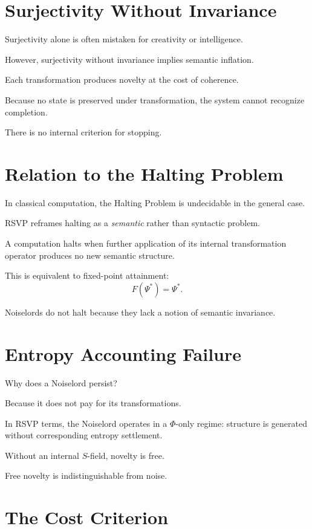 \documentclass[11pt]{book}
\begin{document}
\section{Surjectivity Without Invariance}

Surjectivity alone is often mistaken for creativity or intelligence.

However, surjectivity without invariance implies semantic inflation.

Each transformation produces novelty at the cost of coherence.

Because no state is preserved under transformation, the system cannot recognize
completion.

There is no internal criterion for stopping.

\section{Relation to the Halting Problem}

In classical computation, the Halting Problem is undecidable in the general
case.

RSVP reframes halting as a \emph{semantic} rather than syntactic problem.

\begin{definition}
A computation halts when further application of its internal transformation
operator produces no new semantic structure.
\end{definition}

This is equivalent to fixed-point attainment:
\[
F(\Psi^\ast) = \Psi^\ast.
\]

Noiselords do not halt because they lack a notion of semantic invariance.

\section{Entropy Accounting Failure}

Why does a Noiselord persist?

Because it does not pay for its transformations.

In RSVP terms, the Noiselord operates in a \(\Phi\)-only regime:
structure is generated without corresponding entropy settlement.

Without an internal \(S\)-field, novelty is free.

Free novelty is indistinguishable from noise.

\section{The Cost Criterion}
\end{document}
